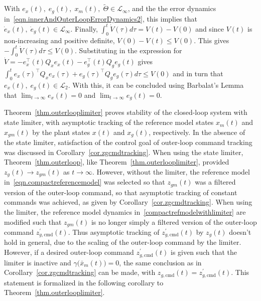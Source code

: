 \begin{proof-dan}
  With $e_{x}(t),\;e_{g}(t),\;x_{m}(t),\;\widetilde{\Theta}\in\mathcal{L}_{\infty}$, and the the error dynamics in\ \eqref{eqn.innerAndOuterLoopErrorDynamics2}, this implies that $\dot{e}_{x}(t), \; \dot{e}_{g}(t)\in\mathcal{L}_{\infty}$.
  Finally, $\int_{0}^{t}\dot{V}(\tau)d\tau=V(t)-V(0)$ and since $V(t)$ is non-increasing and positive definite, $V(0)-V(t)\leq V(0)$.
  This gives $-\int_{0}^{t}\dot{V}(\tau)d\tau\leq V(0)$.
  Substituting in the expression for $\dot{V}= - e_{x}^{\top}(t)Q_{x}e_{x}(t) - e_{g}^{\top}(t)Q_{g}e_{g}(t)$ gives $\int_{0}^{t}e_{x}(\tau)^{\top}Q_{x}e_{x}(\tau) + e_{g}(\tau)^{\top}Q_{g}e_{g}(\tau)d\tau\leq V(0)$ and in turn that $e_{x}(t),\;e_{g}(t)\in\mathcal{L}_{2}$.
  With this, it can be concluded using Barbalat's Lemma\ \cite{narendra.stable.2005} that $\lim_{t\rightarrow\infty}e_{x}(t)=0$ and $\lim_{t\rightarrow\infty}e_{g}(t)=0$.
\end{proof-dan}

Theorem~\ref{thm.outerlooplimiter} proves stability of the closed-loop system with state limiter, with asymptotic tracking of the reference model states $x_{m}(t)$ and $x_{gm}(t)$ by the plant states $x(t)$ and $x_{g}(t)$, respectively.
In the absence of the state limiter, satisfaction of the control goal of outer-loop command tracking was discussed in Corollary~\ref{cor.zgcmdtracking}.
When using the state limiter, Theorem~\ref{thm.outerloop}, like Theorem~\ref{thm.outerlooplimiter}, provided $z_{g}(t)\rightarrow z_{gm}(t)$ as $t\rightarrow\infty$.
However, without the limiter, the reference model in\ \eqref{eqn.compactreferencemodel} was selected so that $z_{gm}(t)$ was a filtered version of the outer-loop command, so that asymptotic tracking of constant commands was achieved, as given by Corollary~\ref{cor.zgcmdtracking}.
When using the limiter, the reference model dynamics in\ \eqref{compactrefmodelwithlimiter} are modified such that $z_{gm}(t)$ is no longer simply a filtered version of the outer-loop command $z_{g,\text{cmd}}^{\prime}(t)$.
Thus asymptotic tracking of $z_{g,\text{cmd}}^{\prime}(t)$ by $z_{g}(t)$ doesn't hold in general, due to the scaling of the outer-loop command by the limiter.
However, if a desired outer-loop command $z_{g,\text{cmd}}^{\prime}(t)$ is given such that the limiter is inactive and $\gamma\bigr(\bar{x}_{m}(t)\bigr)=0$, the same conclusion as in Corollary~\ref{cor.zgcmdtracking} can be made, with $z_{g,\text{cmd}}(t) = z_{g,\text{cmd}}^{\prime}(t)$.
This statement is formalized in the following corollary to Theorem~\ref{thm.outerlooplimiter}.

